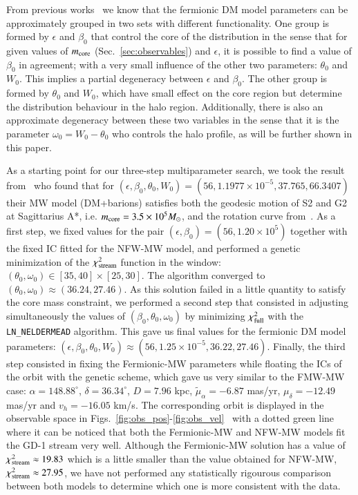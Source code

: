 \documentclass[twocolumn]{aa}
\begin{document}
From previous works~\citep{arguelles_novel_2018,2019PDU....24..278A,2023ApJ...945....1K} we know that the fermionic DM model parameters can be approximately grouped in two sets with different functionality. One group is formed
by $\epsilon$ and $\beta_0$ that control the core of the distribution in the sense that
for given values of $m_{\rm{core}}$ (Sec.~\ref{sec:observables}) and $\epsilon$, it is possible to find a value of $\beta_0$ in agreement; with a very small influence of the other two parameters: $\theta_0$ and $W_0$. This implies a partial degeneracy between $\epsilon$ and $\beta_0$.
The other group is formed by $\theta_0$ and $W_0$, which have small effect on the core region but
determine the distribution behaviour in the halo region. Additionally, there is also an approximate
degeneracy between these two variables in the sense that it is the parameter
$\omega_0 = W_0-\theta_0$ who controls the halo profile, as will be further shown in this paper.

As a starting point for our three-step multiparameter search, we took the result from~\citet{2020A&A...641A..34B} who found that for $(\epsilon, \beta_0, \theta_0, W_0)=(56, 1.1977\times10^{-5}, 37.765, 66.3407)$
their MW model (DM+barions) satisfies both the geodesic motion of S2 and G2 at Sagittarius A*, i.e. $m_{\rm core}=3.5\times 10^5 M_\odot$, and the rotation curve from~\citet{sofue_rotation_2013}.
As a first step, we fixed values for the pair $(\epsilon,\beta_0)=(56,1.20\times10^{5})$ together with
the fixed IC fitted for the NFW-MW model, and performed a genetic minimization of the
$\chi^2_{\rm{stream}}$ function in the window:
$(\theta_0,\omega_0)\in [35, 40]\times[25, 30]$. The algorithm converged to
$(\theta_0, \omega_0)\approx (36.24, 27.46)$. As this solution failed in a little quantity to satisfy
the core mass constraint, we performed a second step that consisted in adjusting simultaneously
the values of $(\beta_0,\theta_0,\omega_0)$ by minimizing $\chi^2_{\rm{full}}$ with the
\texttt{LN\_NELDERMEAD} algorithm. This gave us final values for the fermionic DM model parameters:
$(\epsilon, \beta_0, \theta_0, W_0)\approx(56, 1.25\times10^{-5}, 36.22, 27.46)$.
Finally, the third step consisted in fixing the Fermionic-MW parameters while floating the ICs of the orbit with the genetic scheme, which gave us very similar to the FMW-MW case:
$\alpha=148.88^{\circ}$, $\delta=36.34^{\circ}$, $D=7.96$ kpc,
$\tilde{\mu}_\alpha=-6.87$ mas/yr, $\mu_\delta=-12.49$ mas/yr and $v_h=-16.05$ km/s.
The corresponding orbit is displayed in the observable space in Figs.~\ref{fig:obs_pos}-\ref{fig:obs_vel}~
with a dotted green line where it can be noticed that both the Fermionic-MW and NFW-MW models
fit the GD-1 stream very well.
Although the Fermionic-MW solution has a value of $\chi^2_{\rm{stream}}\approx 19.83$
which is a little smaller than the value obtained for NFW-MW, $\chi^2_{\rm{stream}}\approx 27.95$,
we have not performed any statistically rigourous comparison between both models to determine which one is
more consistent with the data.
\end{document}

